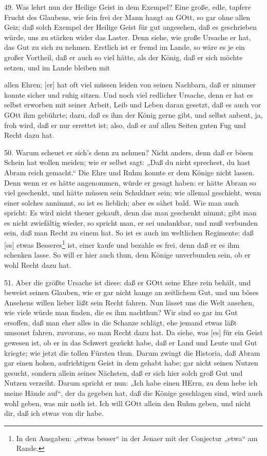 49. Was lehrt nun der Heilige Geist in dem Exempel? Eine große, edle, tapfere Frucht des Glaubens, wie fein frei der Mann hangt an GOtt, so gar ohne allen Geiz; daß solch Exempel der Heilige Geist für gut angesehen, daß es geschrieben würde, uns zu stärken wider das Laster. Denn siehe, wie große Ursache er hat, das Gut zu sich zu nehmen. Erstlich ist er fremd im Lande, so wäre es je ein großer Vortheil, daß er auch so viel hätte, als der König, daß er sich möchte setzen, und im Lande bleiben mit


allen Ehren; [er] hat oft viel müssen leiden von seinen Nachbarn, daß er nimmer konnte sicher und ruhig sitzen. Und noch viel redlicher Ursache, denn er hat es selbst erworben mit seiner Arbeit, Leib und Leben daran gesetzt, daß es auch vor GOtt ihm gebührte; dazu, daß es ihm der König gerne gibt, und selbst anbeut, ja, froh wird, daß er nur errettet ist; also, daß er auf allen Seiten guten Fug und Recht dazu hat.

50. Warum scheuet er sich’s denn zu nehmen? Nicht anders, denn daß er bösen Schein hat wollen meiden; wie er selbst sagt: „Daß du nicht sprechest, du hast Abram reich gemacht.“ Die Ehre und Ruhm konnte er dem Könige nicht lassen. Denn wenn er es hätte angenommen, würde er gesagt haben: er hätte Abram so viel geschenkt, und hätte müssen sein Schuldner sein; wie allemal geschieht, wenn einer solches annimmt, so ist es lieblich; aber es sähet bald. Wie man auch spricht: Es wird nicht theuer gekauft, denn das man geschenkt nimmt; gibt man es nicht zwiefältig wieder, so spricht man, er sei undankbar, und muß verbunden sein, daß man Recht zu einem hat. So ist es auch im weltlichen Regimente: daß [es] etwas Besseres\footnote{In den Ausgaben: „etwas besser“ in der Jenaer mit der Conjectur „etwa“ am Rande.} ist, einer kaufe und bezahle es frei, denn daß er es ihm schenken lasse. So will er hier auch thun, dem Könige unverbunden sein, ob er wohl Recht dazu hat.

51. Aber die größte Ursache ist diese: daß er GOtt seine Ehre rein behält, und beweist seinen Glauben, wie er gar nicht hange an zeitlichem Gut, und um böses Ansehens willen lieber läßt sein Recht fahren. Nun lässet uns die Welt ansehen, wie viele würde man finden, die es ihm nachthun? Wir sind so gar im Gut ersoffen, daß man eher alles in die Schanze schlägt, ehe jemand etwas läßt umsonst fahren, zuvorans, so man Recht dazu hat. Da siehe, was [es] für ein Geist gewesen ist, ob er in das Schwert gezückt habe, daß er Land und Leute und Gut kriegte; wie jetzt die tollen Fürsten thun. Darum zwingt die Historia, daß Abram gar einen hohen, aufrichtigen Geist in dem gehabt habe; gar nicht seinen Nutzen gesucht, sondern allein seines Nächsten, daß er sich hier solch groß Gut und Nutzen verzeiht. Darum spricht er nun: „Ich habe einen HErrn, zu dem hebe ich meine Hände auf“, der da gegeben hat, daß die Könige geschlagen sind, wird auch wohl geben, was mir noth ist. Ich will GOtt allein den Ruhm geben, und nicht dir, daß ich etwas von dir habe.

